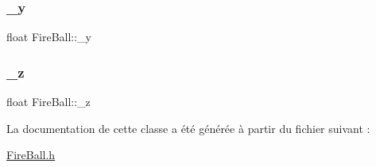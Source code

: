 \subsubsection{\texorpdfstring{\+\_\+y}{\_y}}
{\footnotesize\ttfamily float Fire\+Ball\+::\+\_\+y\hspace{0.3cm}{\ttfamily [private]}}

\mbox{\label{classFireBall_abed9b335d2b3b4973de5bdc959acf936}} 
\subsubsection{\texorpdfstring{\+\_\+z}{\_z}}
{\footnotesize\ttfamily float Fire\+Ball\+::\+\_\+z\hspace{0.3cm}{\ttfamily [private]}}



La documentation de cette classe a été générée à partir du fichier suivant \+:\begin{DoxyCompactItemize}
\item 
\hyperlink{FireBall_8h}{Fire\+Ball.\+h}\end{DoxyCompactItemize}
